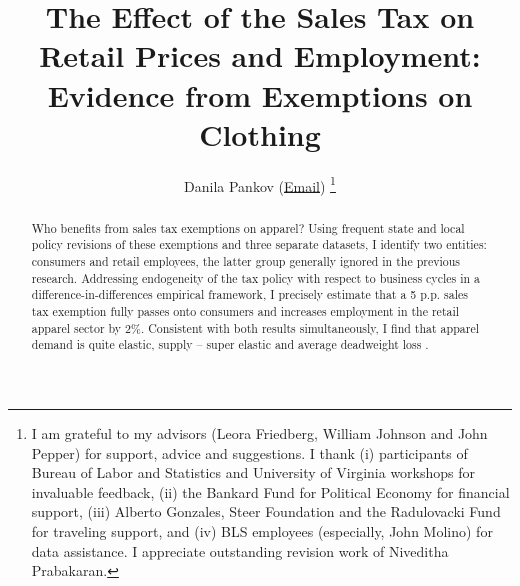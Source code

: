 \documentclass[12pt]{article}
\begin{document}
	
	\title{ \vspace{-2.0cm} The Effect of the Sales Tax on Retail Prices and Employment: Evidence from Exemptions on Clothing}
	\author{Danila Pankov (\href{mailto:dap2rb@virginia.edu}{Email}) \thanks{\protect\doublespacing\normalsize I am grateful to my advisors (Leora Friedberg, William Johnson and John Pepper) for support, advice and suggestions. I thank (i) participants of Bureau of Labor and Statistics and University of Virginia workshops for invaluable feedback, (ii) the Bankard Fund for Political Economy for financial support, (iii) Alberto Gonzales, Steer Foundation and  the Radulovacki Fund for traveling support, and (iv) BLS employees (especially, John Molino) for data assistance. I appreciate outstanding revision work of Niveditha Prabakaran. }} %
	
		\maketitle
			
		\begin{abstract}
			 \normalsize
			Who benefits from sales tax exemptions on apparel? Using frequent state and local policy revisions of these exemptions and three separate datasets, I identify two entities: consumers and retail employees, the latter group generally ignored in the previous research. Addressing endogeneity of the tax policy with respect to business cycles in a difference-in-differences empirical framework, I precisely estimate that a 5 p.p. sales tax exemption fully passes onto consumers and increases employment in the retail apparel sector by 2\%. Consistent with both results simultaneously, I find that apparel demand is quite elastic, supply – super elastic and  average deadweight loss \textcentoldstyle{}. 
		\end{abstract}
		
\end{document}
